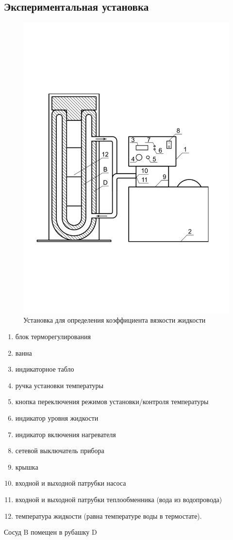 \documentclass[a4paper,12pt]{article}
\theoremstyle{plain} %
\theoremstyle{definition} %
\theoremstyle{remark} %
\begin{document}
	\subsection{Экспериментальная установка}
	\begin{figure}[h]
		\begin{center}
			\includegraphics[width=0.5\linewidth]{1}
		\end{center}
	\caption{Установка для определения коэффициента вязкости жидкости}
	\end{figure}
\begin{enumerate}
	\item блок терморегулирования
	\item ванна
	\item индикаторное табло
	\item ручка установки температуры
	\item кнопка переключения режимов установки/контроля температуры
	\item индикатор уровня жидкости
	\item индикатор включения нагревателя
	\item сетевой выключатель прибора
	\item крышка
	\item входной и выходной патрубки насоса
	\item входной и выходной патрубки теплообменника (вода из водопровода)
	\item температура жидкости (равна температуре воды в термостате).
\end{enumerate}
Сосуд B помещен в рубашку D
\end{document}
